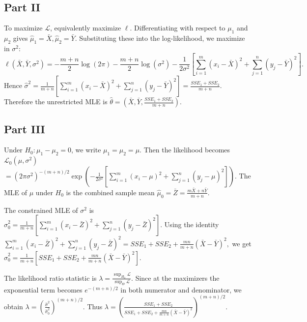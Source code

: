 \documentclass[letterpaper]{article}
\begin{document}
	\clearpage
	
	\subsection{Part II}
	
	To maximize $\mathcal L$, equivalently maximize $\ell$. Differentiating with respect to $\mu_1$ and $\mu_2$ gives
	$
	\hat\mu_1=\bar X,  \hat\mu_2=\bar Y.
	$ Substituting these into the log-likelihood, we maximize in $\sigma^2$:
	$$
	\ell(\bar X,\bar Y,\sigma^2)
	=
	-\frac{m+n}{2}\log(2\pi)
	-\frac{m+n}{2}\log(\sigma^2)
	-\frac{1}{2\sigma^2}
	\left[
	\sum_{i=1}^m (x_i-\bar X)^2+\sum_{j=1}^n (y_j-\bar Y)^2
	\right].
	$$
	Hence
	$
	\hat\sigma^2
	=
	\frac{1}{m+n}
	\left[
	\sum_{i=1}^m (x_i-\bar X)^2+\sum_{j=1}^n (y_j-\bar Y)^2
	\right]
	=
	\frac{SSE_1+SSE_2}{m+n}.
	$ Therefore the unrestricted MLE is
	$
	\hat\theta=
	\left(
	\bar X,\bar Y,\frac{SSE_1+SSE_2}{m+n}
	\right).
	$
	
	\clearpage
	
	\subsection{Part III}
	
	Under $H_0:\mu_1-\mu_2=0$, we write $\mu_1=\mu_2=\mu$. Then the likelihood becomes $
	\mathcal L_0(\mu,\sigma^2)$\\
	$
	=
	(2\pi\sigma^2)^{-(m+n)/2}
	\exp\!\left(
	-\frac{1}{2\sigma^2}
	\left[
	\sum_{i=1}^m (x_i-\mu)^2+\sum_{j=1}^n (y_j-\mu)^2
	\right]
	\right).
	$ The MLE of $\mu$ under $H_0$ is the combined sample mean
	$
	\hat\mu_0=\bar Z=\frac{m\bar X+n\bar Y}{m+n}.
	$
	
	The constrained MLE of $\sigma^2$ is
	$
	\hat\sigma_0^2
	=
	\frac{1}{m+n}
	\left[
	\sum_{i=1}^m (x_i-\bar Z)^2+\sum_{j=1}^n (y_j-\bar Z)^2
	\right].
	$ Using the identity
	$
	\sum_{i=1}^m (x_i-\bar Z)^2+\sum_{j=1}^n (y_j-\bar Z)^2$$
	=
	SSE_1+SSE_2+\frac{mn}{m+n}(\bar X-\bar Y)^2,
	$
	we get
	$
	\hat\sigma_0^2
	=
	\frac{1}{m+n}
	\left[
	SSE_1+SSE_2+\frac{mn}{m+n}(\bar X-\bar Y)^2
	\right].
	$
	
	The likelihood ratio statistic is
	$
	\lambda
	=
	\frac{\sup_{H_0}\mathcal L}{\sup_{\Theta}\mathcal L}.
	$
	Since at the maximizers the exponential term becomes $e^{-(m+n)/2}$ in both numerator and denominator, we obtain
	$
	\lambda
	=
	\left(\frac{\hat\sigma^2}{\hat\sigma_0^2}\right)^{(m+n)/2}.
	$
	Thus
	$
	\lambda
	=
	\left(
	\frac{SSE_1+SSE_2}
	{SSE_1+SSE_2+\frac{mn}{m+n}(\bar X-\bar Y)^2}
	\right)^{(m+n)/2}.
	$
	
\end{document}
